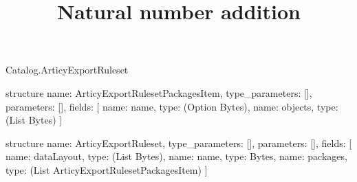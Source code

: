 \begin{lexlean}{Catalog.ArticyExportRuleset}
\title{Natural number addition}
\begin{semanticmodule}
structure{
  name: ArticyExportRulesetPackagesItem,
  type_parameters: [],
  parameters: [],
  fields: [
    {name: name, type: (Option Bytes)},
    {name: objects, type: (List Bytes)}
  ]
}

structure{
  name: ArticyExportRuleset,
  type_parameters: [],
  parameters: [],
  fields: [
    {name: dataLayout, type: (List Bytes)},
    {name: name, type: Bytes},
    {name: packages, type: (List ArticyExportRulesetPackagesItem)}
  ]
}
\end{semanticmodule}
\end{lexlean}
